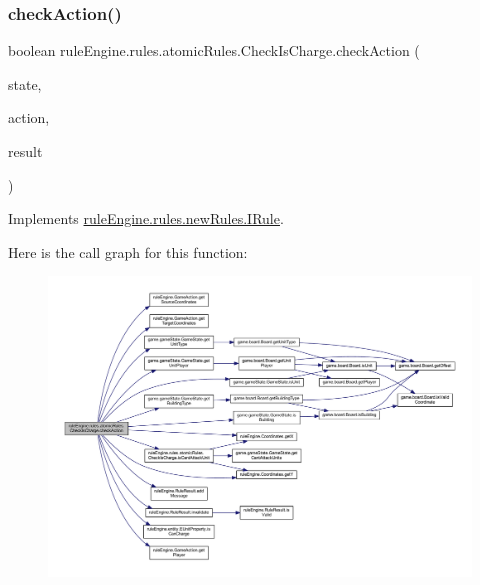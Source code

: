 \subsubsection{\texorpdfstring{check\+Action()}{checkAction()}}
{\footnotesize\ttfamily boolean rule\+Engine.\+rules.\+atomic\+Rules.\+Check\+Is\+Charge.\+check\+Action (\begin{DoxyParamCaption}\item[{\mbox{\hyperlink{classgame_1_1game_state_1_1_game_state}{Game\+State}}}]{state,  }\item[{\mbox{\hyperlink{classrule_engine_1_1_game_action}{Game\+Action}}}]{action,  }\item[{\mbox{\hyperlink{classrule_engine_1_1_rule_result}{Rule\+Result}}}]{result }\end{DoxyParamCaption})\hspace{0.3cm}{\ttfamily [inline]}}



Implements \mbox{\hyperlink{interfacerule_engine_1_1rules_1_1new_rules_1_1_i_rule_a72ce29a47d7a5fba75a09444a50a481e}{rule\+Engine.\+rules.\+new\+Rules.\+I\+Rule}}.

Here is the call graph for this function\+:
\nopagebreak
\begin{figure}[H]
\begin{center}
\leavevmode
\includegraphics[width=350pt]{classrule_engine_1_1rules_1_1atomic_rules_1_1_check_is_charge_a6458591e4a67fc19c5ea490b5da954d3_cgraph}
\end{center}
\end{figure}
\mbox{\label{classrule_engine_1_1rules_1_1atomic_rules_1_1_check_is_charge_a268e5c048a137a32a882802bf494a7c6}} 

